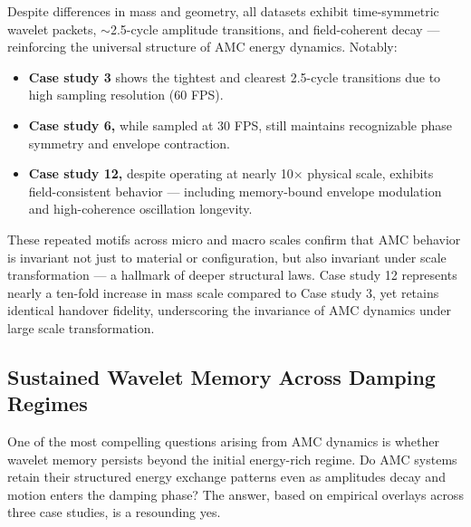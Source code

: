 \documentclass[10pt,aps,pre,onecolumn,superscriptaddress,notitlepage]{revtex4-2}
\begin{document}
Despite differences in mass and geometry, all datasets exhibit time-symmetric wavelet packets, $\sim$2.5-cycle amplitude transitions, and field-coherent decay — reinforcing the universal structure of AMC energy dynamics. 
Notably:

\begin{itemize}
    \item \textbf{Case study 3} shows the tightest and clearest 2.5-cycle transitions due to high sampling resolution (60 FPS).
    \item \textbf{Case study 6,} while sampled at 30 FPS, still maintains recognizable phase symmetry and envelope contraction.
    \item \textbf{Case study 12,} despite operating at nearly 10× physical scale, exhibits field-consistent behavior — including memory-bound envelope modulation and high-coherence oscillation longevity.
\end{itemize}

These repeated motifs across micro and macro scales confirm that AMC behavior is invariant not just to material or configuration, but also invariant under scale transformation — a hallmark of deeper structural laws. Case study 12 represents nearly a ten-fold increase in mass scale compared to Case study 3, yet retains identical handover fidelity, underscoring the invariance of AMC dynamics under large scale transformation. 
\clearpage
\subsection{Sustained Wavelet Memory Across Damping Regimes}
\label{sec:SustainedWaveletMemory}
One of the most compelling questions arising from AMC dynamics is whether wavelet memory persists beyond the initial energy-rich regime. Do AMC systems retain their structured energy exchange patterns even as amplitudes decay and motion enters the damping phase? The answer, based on empirical overlays across three case studies, is a resounding yes.
\end{document}
